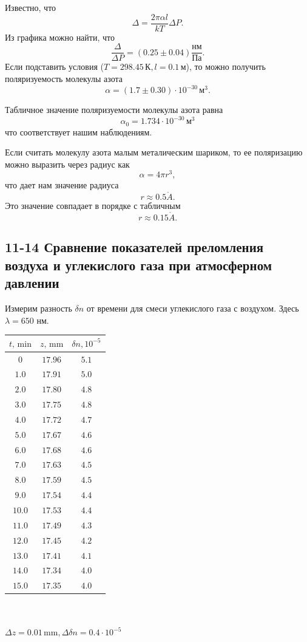 \documentclass[a4paper,12pt]{article}
\renewcommand{\AA}{\ensuremath{\mathring{A}}}
\begin{document}
Известно, что
\[\Delta = \frac{2\pi\alpha l}{kT}\Delta P.\]
Из графика можно найти, что
\[\frac{\Delta}{\Delta P} = (0.25 \pm 0.04)\frac{\text{нм}}{\text{Па}}.\]
Если подставить условия ($T=298.45\,\text{К}, l=0.1\,\text{м}$), то можно получить поляризуемость молекулы азота
\[\alpha = (1.7\pm0.30) \cdot 10^{-30}\,\text{м}^3.\]

Табличное значение поляризуемости молекулы азота равна
\[\alpha_0 = 1.734 \cdot 10^{-30}\,\text{м}^3\]
что соответствует нашим наблюдениям.

Если считать молекулу азота малым металическим шариком, то ее поляризацию можно выразить через радиус как
\[\alpha = 4 \pi r^3,\]
что дает нам значение радиуса
\[r \approx 0.5 \AA.\]
Это значение совпадает в порядке с табличным
\[r \approx 0.15 \AA.\]
\subsection*{11-14 Сравнение показателей преломления воздуха и углекислого газа при атмосферном давлении}
Измерим разность $\delta n$ от времени для смеси углекислого газа с воздухом. Здесь $\lambda = 650$ нм.

\begin{center}
\begin{tabular}{|c|c|c|}\hline
$t\text{, min}$&$z\text{, mm}$&$\delta n, 10^{-5}$\\\hline
$0$&$17.96$&$5.1$\\\hline
$1.0$&$17.91$&$5.0$\\\hline
$2.0$&$17.80$&$4.8$\\\hline
$3.0$&$17.75$&$4.8$\\\hline
$4.0$&$17.72$&$4.7$\\\hline
$5.0$&$17.67$&$4.6$\\\hline
$6.0$&$17.68$&$4.6$\\\hline
$7.0$&$17.63$&$4.5$\\\hline
$8.0$&$17.59$&$4.5$\\\hline
$9.0$&$17.54$&$4.4$\\\hline
$10.0$&$17.53$&$4.4$\\\hline
$11.0$&$17.49$&$4.3$\\\hline
$12.0$&$17.45$&$4.2$\\\hline
$13.0$&$17.41$&$4.1$\\\hline
$14.0$&$17.34$&$4.0$\\\hline
$15.0$&$17.35$&$4.0$\\\hline
\end{tabular}\\~\\
$\Delta z=0.01\,\text{mm}, \Delta \delta n=0.4\cdot10^{-5}$
\end{center}
\end{document}
